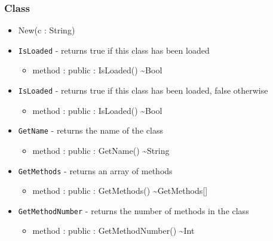 \documentclass[12pt]{article}
\begin{document}
\subsubsection{Class}
\begin{itemize}
\item New(c : String)
\item \texttt{IsLoaded} - returns true if this class has been loaded
  \begin{itemize}
  \item method : public : IsLoaded() \textasciitilde Bool
  \end{itemize}
\item \texttt{IsLoaded} - returns true if this class has been loaded,
  false otherwise
  \begin{itemize}
  \item method : public : IsLoaded() \textasciitilde Bool
  \end{itemize}
\item \texttt{GetName} - returns the name of the class
  \begin{itemize}
  \item method : public : GetName() \textasciitilde String
  \end{itemize}
\item \texttt{GetMethods} - returns an array of methods
  \begin{itemize}
  \item method : public : GetMethods() \textasciitilde GetMethods[]
  \end{itemize}
\item \texttt{GetMethodNumber} - returns the number of methods in the class
  \begin{itemize}
  \item method : public : GetMethodNumber() \textasciitilde Int
  \end{itemize}
\end{itemize}
\end{document}
